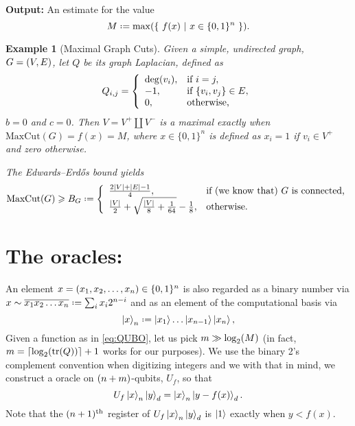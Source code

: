 \documentclass[reqno,oneside,12pt]{amsart}  %
\numberwithin{equation}{section}                %
\let\originalleft\left
\let\originalright\right
\renewcommand{\left}{\mathopen{}\mathclose\bgroup\originalleft}
\renewcommand{\right}{\aftergroup\egroup\originalright}
\def\({\mathopen{}\left(}
\def\){\right)\mathclose{}}
\newcommand*{\eqdef}{\mathrel{\vcenter{\baselineskip0.5ex \lineskiplimit0pt\hbox{.}\hbox{.}}}=}
\newtheorem{example}[theorem]{Example}
\def\tr{\mathrm{tr}}
\begin{document}
\smallskip

\noindent\textbf{Output:} An estimate for the value
\begin{equation}
   M \eqdef \max \( \left\{ \ f (x) \ \middle| \ x \in \{ 0, 1 \}^n \ \right\} \).
\end{equation}

\medskip

\begin{example}[Maximal Graph Cuts]
   Given a simple, undirected graph, $G = \( V, E \)$, let $Q$ be its graph Laplacian, defined as
   \begin{equation}
      Q_{i, j} = \left\{ \begin{array}{ll} \deg \( v_i \), & \mbox{if } i = j, \\ - 1, & \mbox{if } \{ v_i, v_j \} \in E, \\ 0, & \mbox{otherwise,} \end{array} \right.
   \end{equation}
   $b = 0$ and $c = 0$. Then $V = V^+ \coprod V^-$ is a maximal exactly when $\mathrm{MaxCut} (G) = f(x) = M$, where $x \in \{ 0, 1 \}^n$ is defined as $x_i = 1$ if $v_i \in V^+$ and zero otherwise.

   The Edwards--Erd\H{o}s bound yields
   \begin{equation}
      \mathrm{MaxCut} (G) \geqslant B_G \eqdef \left\{ \begin{array}{ll} \frac{2 |V| + |E| - 1}{4}, & \mbox{if (we know that) $G$ is connected,} \\ \frac{|V|}{2} + \sqrt{\tfrac{|V|}{8} + \tfrac{1}{64}} - \frac{1}{8}, & \mbox{otherwise.} \end{array} \right.
   \end{equation}
\end{example}

\bigskip

\section{The oracles:}

An element $x = \( x_1, x_2, \ldots, x_n \) \in \{ 0, 1 \}^n$ is also regarded as a binary number via $x \sim \overline{x_1 x_2 \ldots x_n} \eqdef \sum_i x_i 2^{n - i}$ and as an element of the computational basis via
\begin{equation}
   \ket{x}_n \eqdef \ket{x_1} \ldots \ket{x_{n - 1}} \ket{x_n},
\end{equation}
Given a function as in \cref{eq:QUBO}, let us pick $m \gg \log_2 \( M \)$ (in fact, $m = \left\lceil \log_2 \( \tr \( Q \) \) \right\rceil + 1$ works for our purposes). We use the binary 2’s complement convention when digitizing integers and we with that in mind, we construct a oracle on $\( n + m \)$-qubits, $U_f$, so that
\begin{equation}
   U_f \ket{x}_n \ket{y}_d = \ket{x}_n \ket{y - f (x)}_d.
\end{equation}
Note that the $\( n + 1 \)^{\mathrm{th}}$ register of $U_f \ket{x}_n \ket{y}_d$ is $\ket{1}$ exactly when $y < f (x)$.
\end{document}
